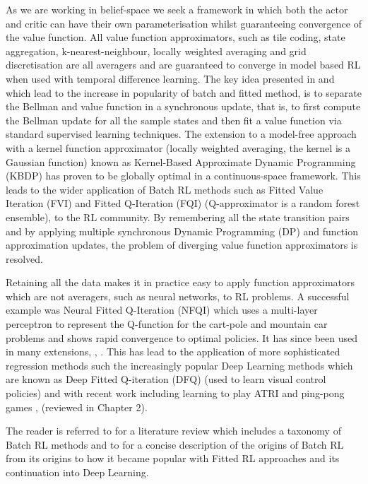 As we are working in belief-space we seek a framework in which both the actor and critic can have 
their own parameterisation whilst guaranteeing convergence of the value function. All value function approximators, 
such as tile coding,  state aggregation, k-nearest-neighbour, locally weighted averaging and grid discretisation 
are all averagers and are guaranteed to converge in model based RL \cite{stable_FA_gordon_1995} when used with 
temporal difference learning. The key idea presented in \cite{stable_FA_gordon_1995} and which lead to the increase in popularity
of batch and fitted method, is to separate the Bellman and value function in a synchronous update, that 
is, to first compute the Bellman update for all the sample states and then fit a value function via standard supervised 
learning techniques. The extension to a model-free approach with a kernel function approximator (locally weighted averaging, the 
kernel is a Gaussian function) known as Kernel-Based Approximate Dynamic Programming (KBDP) \cite{kernel_rl_ormoneit_2002}
has proven to be globally optimal in a continuous-space framework. This leads to the wider application of Batch RL methods 
such as Fitted Value Iteration (FVI) \cite{fvi_uav_2010} and Fitted Q-Iteration (FQI) \cite{EGW05} (Q-approximator is a random forest ensemble),
\cite{fqi_nips_peter_2009} to the RL community. By remembering all the state transition pairs and by applying multiple 
synchronous Dynamic Programming (DP) and function approximation updates, the problem of diverging value function approximators is resolved. 

Retaining all the data makes it in practice easy to apply function approximators which are not averagers, such as neural networks,
to RL problems. A successful example was Neural Fitted Q-Iteration (NFQI) \cite{Riedmiller2005} which 
uses a multi-layer perceptron to represent the Q-function for the cart-pole and mountain car problems and 
shows rapid convergence to optimal policies. It has since been used in many extensions, \cite{NAC_2008}, \cite{rl_gmm_2010}.
This has lead to the application of more sophisticated regression methods such the increasingly popular Deep Learning methods 
which are known as Deep Fitted Q-iteration (DFQ)\cite{Lange_riedmiller_2010} (used to learn visual control policies) 
and with recent work including learning to play ATRI and ping-pong games \cite{mnih-dqn-2015}, \cite{DRQ_AAAI_2015} (reviewed
in Chapter 2).

The reader is referred to \cite{approx_rl_overview_2011} for a literature review which includes a taxonomy of 
Batch RL methods and to \cite[Chap 2]{RL_state_art_2012} for a concise description of the origins of Batch RL from 
its origins to how it became popular with Fitted RL approaches and its continuation into Deep Learning.

